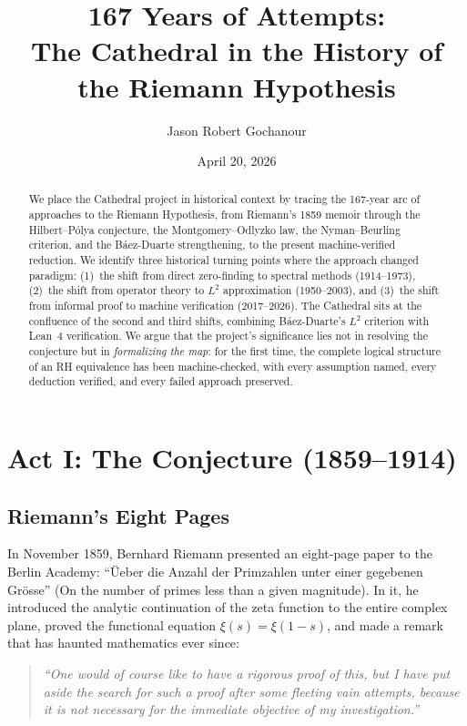 \documentclass[11pt,a4paper]{article}
\title{%
  167 Years of Attempts:\\
  The Cathedral in the History of the Riemann Hypothesis%
}
\author{
  Jason Robert Gochanour
}
\date{April 20, 2026}
\begin{document}
\maketitle

\begin{abstract}
We place the Cathedral project in historical context by tracing
the 167-year arc of approaches to the Riemann Hypothesis, from
Riemann's 1859 memoir through the Hilbert--P\'olya conjecture,
the Montgomery--Odlyzko law, the Nyman--Beurling criterion, and
the B\'aez-Duarte strengthening, to the present machine-verified
reduction. We identify three historical turning points where the
approach changed paradigm: (1)~the shift from direct zero-finding
to spectral methods (1914--1973), (2)~the shift from operator
theory to $L^2$ approximation (1950--2003), and (3)~the shift
from informal proof to machine verification (2017--2026). The
Cathedral sits at the confluence of the second and third shifts,
combining B\'aez-Duarte's $L^2$ criterion with Lean~4
verification. We argue that the project's significance lies not
in resolving the conjecture but in \emph{formalizing the map}: for
the first time, the complete logical structure of an RH equivalence
has been machine-checked, with every assumption named, every
deduction verified, and every failed approach preserved.
\end{abstract}

\tableofcontents

\section{Act I: The Conjecture (1859--1914)}

\subsection{Riemann's Eight Pages}

In November 1859, Bernhard Riemann presented an eight-page paper
to the Berlin Academy: ``\"Ueber die Anzahl der Primzahlen unter
einer gegebenen Gr\"osse'' (On the number of primes less than a
given magnitude). In it, he introduced the analytic continuation
of the zeta function to the entire complex plane, proved the
functional equation $\xi(s) = \xi(1-s)$, and made a remark that
has haunted mathematics ever since:

\begin{quote}
\emph{``One would of course like to have a rigorous proof of this,
but I have put aside the search for such a proof after some
fleeting vain attempts, because it is not necessary for the
immediate objective of my investigation.''}
\end{quote}
\end{document}
